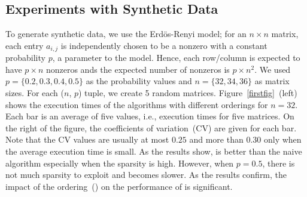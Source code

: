 \documentclass{elektr}
\begin{document}
{\subsection{Experiments with Synthetic Data}
To generate synthetic data, we use the Erd\"{o}s-Renyi model; for an $n \times n$ matrix, each entry $a_{i,j}$ is independently chosen to be a nonzero with a constant probability $p$, a parameter to the model. Hence, each row/column is expected to have $p \times n$ nonzeros ands the expected number of nonzeros is $p \times n^2$. We used $p = \{0.2, 0.3, 0.4, 0.5\}$ as the probability values and $n = \{32, 34, 36\}$ as matrix sizes. For each ($n$, $p$) tuple, we create 5 random matrices. Figure~\ref{firstfig}~(left) shows the execution times of the algorithms with different orderings for $n = 32$. Each bar is an average of five values, i.e., execution times for five matrices. On the right of the figure, the coefficients of variation~(CV) are given for each bar. Note that the CV values are usually at most $0.25$ and more than $0.30$ only when the average execution time is small. As the results show, {} is better than the naive algorithm {} especially when the sparsity is high. However, when $p = 0.5$, 
there is not much sparsity to exploit and  {} becomes slower. As the results confirm, the impact of the ordering~({}) on the performance of {} is significant. 

 
 
}
\end{document}
